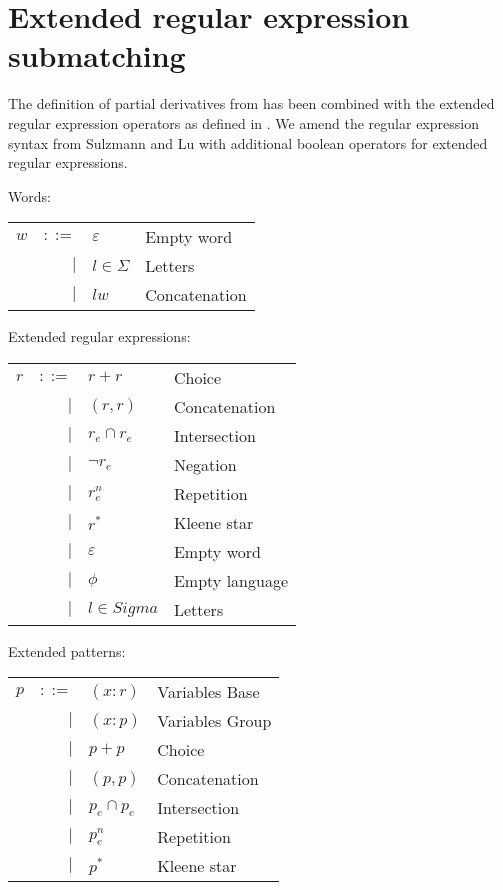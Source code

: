 \newcommand\esetOfRe{\uparrow}
\newcommand\esetsOfRe{\Uparrow}
\newcommand\reOfEset{\downarrow}
\newcommand\reOfEsets{\Downarrow}
\newcommand\eset{\mathcal{E}}
\newcommand\esets{\mathbb{E}}
\newcommand\pset{\mathcal{P}}
\newcommand\psets{\mathbb{P}}


\section{Extended regular expression submatching}
\label{ere-submatch}

The definition of partial derivatives from \cite{pd-pat} has been combined
with the extended regular expression operators as defined in \cite{pd-ere}. We
amend the regular expression syntax from Sulzmann and Lu with additional
boolean operators for extended regular expressions.

Words:

\begin{tabular}{lrll}
   $w$	& $::=$	& $\varepsilon$		& Empty word	\\
	& $|$	& $l \in \Sigma$	& Letters	\\
	& $|$	& $lw$			& Concatenation	\\
\end{tabular}

Extended regular expressions:

\begin{tabular}{lrll}
   $r$		& $::=$	& $r+r$				& Choice		\\
		& $|$	& $(r,r)$			& Concatenation		\\
		& $|$	& $r_e \cap r_e$		& Intersection		\\
        	& $|$	& $\neg r_e$			& Negation		\\
        	& $|$	& $r_e^n$			& Repetition		\\
		& $|$	& $r^*$				& Kleene star		\\
		& $|$	& $\varepsilon$			& Empty word		\\
		& $|$	& $\phi$			& Empty language	\\
		& $|$	& $l \in Sigma$			& Letters		\\
\end{tabular}

Extended patterns:

\begin{tabular}{lrll}
   $p$		& $::=$	& $(x:r)$			& Variables Base	\\
		& $|$	& $(x:p)$			& Variables Group	\\
		& $|$	& $p+p$				& Choice		\\
		& $|$	& $(p,p)$			& Concatenation		\\
		& $|$	& $p_e \cap p_e$		& Intersection		\\
        	& $|$	& $p_e^n$			& Repetition		\\
		& $|$	& $p^*$				& Kleene star		\\
\end{tabular}



